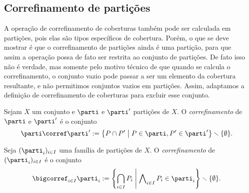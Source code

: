 \subsection{Correfinamento de partições}

A operação de correfinamento de coberturas também pode ser calculada em partições, pois elas são tipos específicos de cobertura. Porém, o que se deve mostrar é que o correfinamento de partições ainda é uma partição, para que assim a operação possa de fato ser restrita ao conjunto de partições. De fato isso não é verdade, mas somente pelo motivo técnico de que quando se calcula o correfinamento, o conjunto vazio pode passar a ser um elemento da cobertura resultante, e não permitimos conjuntos vazios em partições. Assim, adaptamos a definição de correfinamento de coberturas para excluir esse conjunto.

\begin{definition}
Sejam $X$ um conjunto e $\parti$ e $\parti'$ partições de $X$. O \emph{correfinamento} de $\parti$ e $\parti'$ é o conjunto
	\begin{equation*}
	\parti \corref \parti' := \set{P \cap P'}{P \in \parti, P' \in \parti'} \setminus \{\emptyset\}.
	\end{equation*}

Seja $(\parti_i)_{i \in I}$ uma família de partições de $X$. O \emph{correfinamento} de $(\parti_i)_{i \in I}$ é o conjunto
	\begin{equation*}
	\bigcorref_{i \in I} \parti_i := \set{\bigcap_{i \in I} P_i}{\forall_{i \in I} P_i \in \parti_i} \setminus \{\emptyset\}.
	\end{equation*}
\end{definition}

